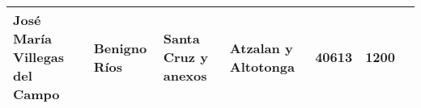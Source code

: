 \documentclass[14pt,twoside,final]{extbook} %
\begin{document}
\begin{sidewaystable}
\begin{tabular}{@{}llllrrl@{}}
José María Villegas del Campo & Benigno Ríos\index[nombres]{Rios, Benigno@Ríos, Benigno} & Santa Cruz\index[lugares]{Santa Cruz!hacienda} y anexos & Atzalan\index[lugares]{Atzalan} y Altotonga\index[lugares]{Altotonga} & 40613 & 1200 & {} \\
\bottomrule
\end{tabular}
\caption*{\textsc{Fuente:} \textsc{arppj}, 1874--1905; \textsc{agnep}, 1881; John R. Southworth, \emph{Directorio oficial de las minas y haciendas de México.} Casino español de México, México, s/f., pp. 242--251; Romana Falcón y Soledad García Morales, \emph{La semilla en el surco. Adalberto Tejeda y el radicalismo en Veracruz, 1883--1960.} El Colegio de México Gobierno del estado de Veracruz, México, 1986, pp.~36--37; \textsc{agev, acam}, Tierras, Jalacingo, Santa Anita, Dotación, c. 135, exp. 243, 1922, fs.~1--2. \\  Papantla, Ver. \\  Libres, Pue.}
\label{tab:haciendas-villegas}
\end{sidewaystable}
\end{document}
